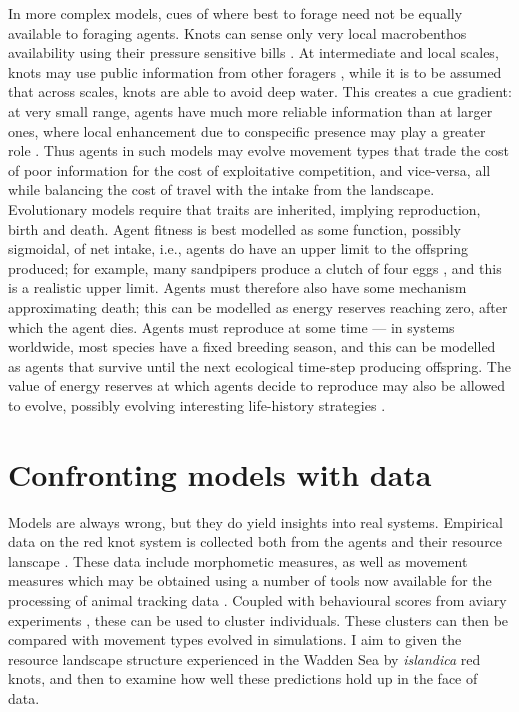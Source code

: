 In more complex models, cues of where best to forage need not be equally
available to foraging agents. Knots can sense only very local
macrobenthos availability using their pressure sensitive bills
\citep{piersma1998}. At intermediate and local scales, knots may use
public information from other foragers \citep{bijleveld2015a}, while it
is to be assumed that across scales, knots are able to avoid deep water.
This creates a cue gradient: at very small range, agents have much more
reliable information than at larger ones, where local enhancement due to
conspecific presence may play a greater role \citep{beauchamp2013}. Thus
agents in such models may evolve movement types that trade the cost of
poor information for the cost of exploitative competition, and
vice-versa, all while balancing the cost of travel with the intake from
the landscape. Evolutionary models require that traits are inherited,
implying reproduction, birth and death. Agent fitness is best modelled
as some function, possibly sigmoidal, of net intake, i.e., agents do
have an upper limit to the offspring produced; for example, many
sandpipers produce a clutch of four eggs \citep{piersma2019}, and this
is a realistic upper limit. Agents must therefore also have some
mechanism approximating death; this can be modelled as energy reserves
reaching zero, after which the agent dies. Agents must reproduce at some
time --- in systems worldwide, most species have a fixed breeding
season, and this can be modelled as agents that survive until the next
ecological time-step producing offspring. The value of energy reserves
at which agents decide to reproduce may also be allowed to evolve,
possibly evolving interesting life-history strategies \citep[as
in][]{wolf2012, wolf2007a}.

\section{Confronting models with data}

Models are always wrong, but they do yield insights into real systems.
Empirical data on the red knot system is collected both from the agents
\citetext{\citealp[ in
\citet{bijleveld2015b}]{maccurdy2015}; \citealp[examples
in][]{bijleveld2016}; \citealp{oudman2018}} and their resource lanscape
\citep{bijleveld2012}. These data include morphometic measures, as well
as movement measures which may be obtained using a number of tools now
available for the processing of animal tracking data \citep[most recent
review by][]{joo2019}. Coupled with behavioural scores from aviary
experiments \citep[currently ongoing at NIOZ; see
e.g.][]{bijleveld2012a, bijleveld2015a}, these can be used to cluster
individuals. These clusters can then be compared with movement types
evolved in simulations. I aim to given the resource landscape structure
experienced in the Wadden Sea by \emph{islandica} red knots, and then to
examine how well these predictions hold up in the face of data.

